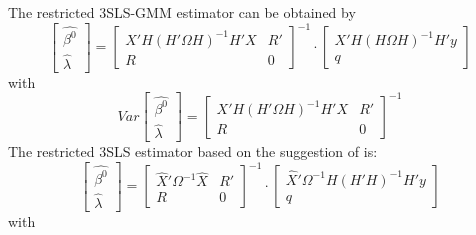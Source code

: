 The restricted 3SLS-GMM estimator can be obtained by
\begin{equation}
   \left[ \begin{array}{c}
      \widehat{\beta^0} \\ \widehat{\lambda}
   \end{array} \right]
   =
   \left[ \begin{array}{cc}
      X' H \left( H' \Omega H \right)^{-1} H' X & R' \\ 
      R & 0
   \end{array} \right]^{-1}
   \cdot
   \left[ \begin{array}{c}
      X' H \left( H \Omega H \right)^{-1} H' y \\ q 
   \end{array} \right]
   \label{eq:3slsGmmR}
\end{equation}
with
\begin{equation}
   Var 
   \left[ \begin{array}{c}
      \widehat{\beta^0} \\ \widehat{\lambda}
   \end{array} \right] 
   = 
   \left[ \begin{array}{cc}
      X' H \left( H' \Omega H \right)^{-1} H' X & R' \\ 
      R & 0
   \end{array} \right]^{-1}
\end{equation}
The restricted 3SLS estimator based on the suggestion of
\cite{schmidt90} is:
\begin{equation}
   \left[ \begin{array}{c}
      \widehat{\beta^0} \\ \widehat{\lambda}
   \end{array} \right]
   =
   \left[ \begin{array}{cc}
      \widehat{X}' \Omega^{-1} \widehat{X} & R' \\ 
      R & 0
   \end{array} \right]^{-1}
   \cdot
   \left[ \begin{array}{c}
      \widehat{X}' \Omega^{-1} H \left( H' H \right)^{-1} H' y \\ q 
   \end{array} \right]
   \label{eq:3slsSchmidtR}
\end{equation}
with
